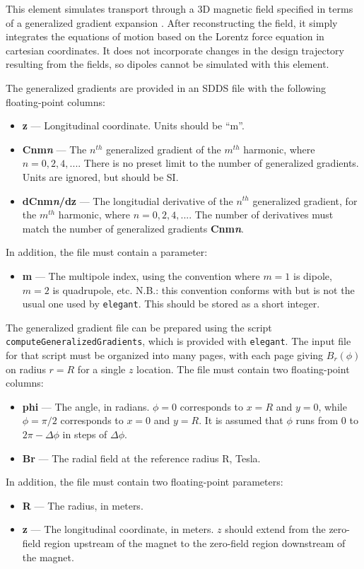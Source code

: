 This element simulates transport through a 3D magnetic field
specified in terms of a generalized gradient expansion \cite{Venturini-NIMA427-387}.
After reconstructing the field, it simply integrates the equations of motion
based on the Lorentz force equation in cartesian coordinates.  It does not
incorporate changes in the design trajectory resulting from the
fields, so dipoles cannot be simulated with this element.

The generalized gradients are provided in an SDDS file with the following floating-point columns:
\begin{itemize}
\item {\bf z} --- Longitudinal coordinate. Units should be ``m''.
\item {\bf Cnm{\em n}} --- The $n^{th}$ generalized gradient of the $m^{th}$ harmonic, where $n=0,2,4,...$.
  There is no preset limit to the number of generalized gradients. Units are ignored,
  but should be SI.
\item {\bf dCnm{\em n}/dz} --- The longitudial derivative of the $n^{th}$ generalized gradient, 
  for the $m^{th}$ harmonic, where $n=0,2,4,...$.
  The number of derivatives must match the number of generalized gradients {\bf Cnm{\em n}}.
\end{itemize}
In addition, the file must contain a parameter:
\begin{itemize}
\item {\bf m} --- The multipole index, using the convention where $m=1$ is dipole, $m=2$ is quadrupole,
  etc. N.B.: this convention conforms with \cite{Venturini-NIMA427-387} but is not the usual one used by
  {\tt elegant}. This should be stored as a short integer.
\end{itemize}

The generalized gradient file can be prepared using the script {\tt computeGeneralizedGradients}, which is
provided with {\tt elegant}. The input file for that script must be organized into many pages, with
each page giving $B_r(\phi)$ on radius $r=R$ for a single $z$ location. The file must contain two floating-point columns:
\begin{itemize}
\item {\bf phi} --- The angle, in radians. $\phi=0$ corresponds to $x=R$ and $y=0$, while $\phi=\pi/2$ corresponds
  to $x=0$ and $y=R$. It is assumed that $\phi$ runs from $0$ to $2\pi - \Delta \phi$ in steps of $\Delta \phi$.
\item {\bf Br} --- The radial field at the reference radius R, Tesla.
\end{itemize}
In addition, the file must contain two floating-point parameters:
\begin{itemize}
\item {\bf R} --- The radius, in meters. 
\item {\bf z} --- The longitudinal coordinate, in meters. $z$ should extend from the zero-field region upstream of the magnet to 
  the zero-field region downstream of the magnet.
\end{itemize}
